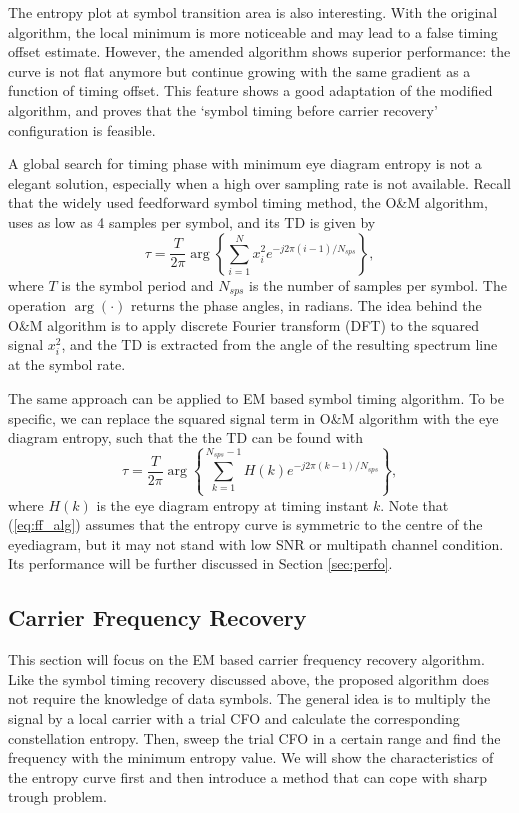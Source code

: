 \documentclass[journal,comsoc]{IEEEtran}
\begin{document}
The entropy plot at symbol transition area is also interesting.
With the original algorithm, the local minimum is more noticeable and may lead to a false timing offset estimate.
However, the amended algorithm shows superior performance:
the curve is not flat anymore but continue growing with the same gradient as a function of timing offset.
This feature shows a good adaptation of the modified algorithm, and proves that the `symbol timing before carrier recovery' configuration is feasible.

A global search for timing phase with minimum eye diagram entropy is not a elegant solution, especially when a high over sampling rate is not available.
Recall that the widely used feedforward symbol timing method, the O\&M algorithm, uses as low as 4 samples per symbol, and its TD is given by
\begin{equation}
\tau=\frac{T}{2\pi}\arg \left\{ {\sum\limits_{i = 1}^{N} {x_i^2{e^{ - j2\pi (i-1)/N_{sps}}}} } \right\},
\end{equation}
where \(T\) is the symbol period and \(N_{sps}\) is the number of samples per symbol.
The operation \(\arg( \cdot )\) returns the phase angles, in radians.
The idea behind the O\&M algorithm is to apply discrete Fourier transform (DFT) to the squared signal \(x_i^2\),
and the TD is extracted from the angle of the resulting spectrum line at the symbol rate.

The same approach can be applied to EM based symbol timing algorithm.
To be specific, we can replace the squared signal term in O\&M algorithm with the eye diagram entropy,
such that the the TD can be found with
\begin{equation}
\tau  = \frac{T}{{2\pi }}\arg \left\{ {\sum\limits_{k = 1}^{N_{sps}-1} {H(k){e^{ - j2\pi (k-1)/N_{sps}}}} } \right\},
\label{eq:ff_alg}
\end{equation}
where \(H(k)\) is the eye diagram entropy at timing instant \(k\).
Note that (\ref{eq:ff_alg}) assumes that the entropy curve is symmetric to the centre of the eyediagram,
but it may not stand with low SNR or multipath channel condition.
Its performance will be further discussed in Section \ref{sec:perfo}.

\subsection{Carrier Frequency Recovery}
This section will focus on the EM based carrier frequency recovery algorithm.
Like the symbol timing recovery discussed above, the proposed algorithm does not require the knowledge of data symbols.
The general idea is to multiply the signal by a local carrier with a trial CFO and calculate the corresponding constellation entropy.
Then, sweep the trial CFO in a certain range and find the frequency with the minimum entropy value.
We will show the characteristics of the entropy curve first and then introduce a method that can cope with sharp trough problem.
\end{document}
